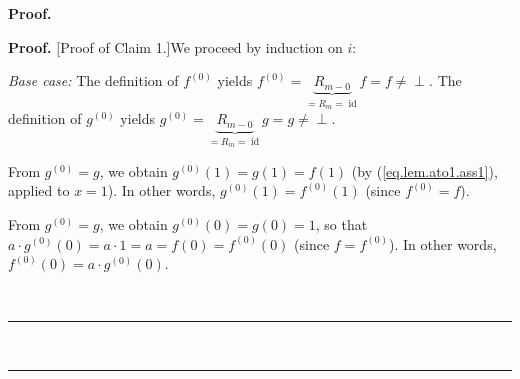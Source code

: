 \documentclass[numbers=enddot,12pt,final,onecolumn,notitlepage]{scrartcl}%
\theoremstyle{definition}
\newenvironment{verlong}{}{}
\newenvironment{statement}{\begin{quote}}{\end{quote}}
\newcommand{\undf}{\operatorname*{\bot}}
\newenvironment{proof}[1][Proof]{\noindent\textbf{#1.} }{\ \rule{0.5em}{0.5em}}
\begin{document}
\begin{verlong}
\begin{proof}
\begin{statement}
\end{statement}

\begin{proof}
[Proof of Claim 1.]We proceed by induction on $i$:

\textit{Base case:} The definition of $f^{\left(  0\right)  }$ yields
$f^{\left(  0\right)  }=\underbrace{R_{m-0}}_{=R_{m}=\operatorname*{id}%
}f=f\neq\undf$. The definition of $g^{\left(  0\right)  }$ yields $g^{\left(
0\right)  }=\underbrace{R_{m-0}}_{=R_{m}=\operatorname*{id}}g=g\neq\undf$.

From $g^{\left(  0\right)  }=g$, we obtain $g^{\left(  0\right)  }\left(
1\right)  =g\left(  1\right)  =f\left(  1\right)  $ (by
(\ref{eq.lem.ato1.ass1}), applied to $x=1$). In other words, $g^{\left(
0\right)  }\left(  1\right)  =f^{\left(  0\right)  }\left(  1\right)  $ (since
$f^{\left(  0\right)  }=f$).

From $g^{\left(  0\right)  }=g$, we obtain $g^{\left(  0\right)  }\left(
0\right)  =g\left(  0\right)  =1$, so that $a\cdot g^{\left(  0\right)
}\left(  0\right)  =a\cdot1=a=f\left(  0\right)  =f^{\left(  0\right)
}\left(  0\right)  $ (since $f=f^{\left(  0\right)  }$). In other words,
$f^{\left(  0\right)  }\left(  0\right)  =a\cdot g^{\left(  0\right)  }\left(
0\right)  $.


\end{proof}
\end{proof}
\end{verlong}
\end{document}
